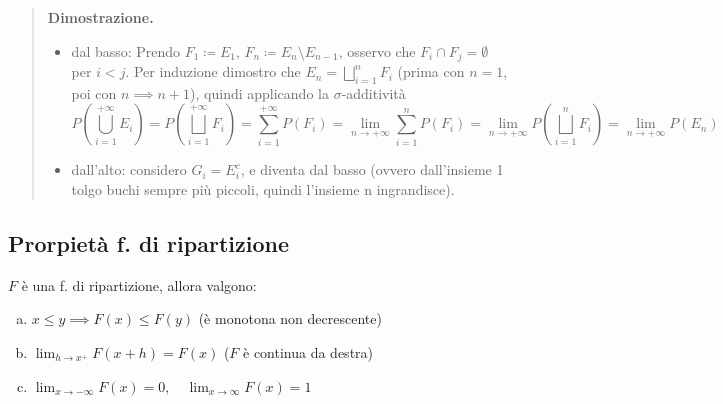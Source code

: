 \documentclass[a4paper,10pt]{article}
\theoremstyle{remark}
\theoremstyle{definition}
\newenvironment{dimo}{\begin{quote}\textbf{Dimostrazione.}}{\end{quote}} %
\begin{document}
\begin{dimo}
\begin{itemize}
\item dal basso: Prendo $F_{1}\coloneqq E_{1},\,F_{n}\coloneqq E_{n}\setminus E_{n-1}$,
osservo che $F_{i}\cap F_{j}=\emptyset$ per $i<j$. Per induzione
dimostro che $E_{n}=\bigsqcup_{i=1}^{n}F_{i}$ (prima con $n=1$, poi con $n\implies n+1$), quindi applicando la
$\sigma$-additività
\[
P\left(\bigcup_{i=1}^{+\infty}E_{i}\right)=P\left(\bigsqcup_{i=1}^{+\infty}F_{i}\right)=\sum_{i=1}^{+\infty}P\left(F_{i}\right)=\lim_{n\rightarrow+\infty}\sum_{i=1}^{n}P\left(F_{i}\right)=\lim_{n\rightarrow+\infty}P\left(\bigsqcup_{i=1}^{n}F_{i}\right)=\lim_{n\rightarrow+\infty}P\left(E_{n}\right)
\]
\item dall'alto: considero $G_{i}=E_{i}^{c}$, e diventa dal basso (ovvero dall'insieme 1 tolgo buchi sempre più piccoli, quindi l'insieme n ingrandisce).
\end{itemize}
\end{dimo}

\subsection*{Prorpietà f. di ripartizione} 
$F$ è una f. di ripartizione, allora valgono:
    \begin{enumerate}[(a)]
        \item $x \le y \implies F(x)\le F(y)$ (è monotona non decrescente)
        \item $\lim_{h\to x^+}F(x+h) = F(x)$ ($F$ è continua da destra)
        \item $\lim_{x\to-\infty}F(x)=0, \quad \lim_{x\to\infty}F(x)=1$
    \end{enumerate}
\end{document}
